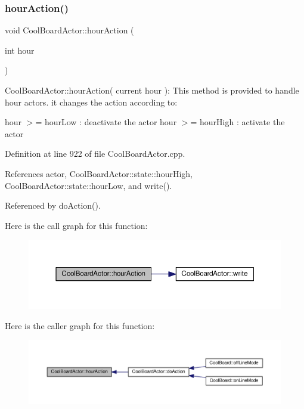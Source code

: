 \subsubsection{\texorpdfstring{hour\+Action()}{hourAction()}}
{\footnotesize\ttfamily void Cool\+Board\+Actor\+::hour\+Action (\begin{DoxyParamCaption}\item[{int}]{hour }\end{DoxyParamCaption})}

Cool\+Board\+Actor\+::hour\+Action( current hour )\+: This method is provided to handle hour actors. it changes the action according to\+:

hour $>$= hour\+Low \+: deactivate the actor hour $>$= hour\+High \+: activate the actor 

Definition at line 922 of file Cool\+Board\+Actor.\+cpp.



References actor, Cool\+Board\+Actor\+::state\+::hour\+High, Cool\+Board\+Actor\+::state\+::hour\+Low, and write().



Referenced by do\+Action().

Here is the call graph for this function\+:
\nopagebreak
\begin{figure}[H]
\begin{center}
\leavevmode
\includegraphics[width=350pt]{dc/d69/class_cool_board_actor_adf3b4e15b9d73681082112adf8ef95cb_cgraph}
\end{center}
\end{figure}
Here is the caller graph for this function\+:
\nopagebreak
\begin{figure}[H]
\begin{center}
\leavevmode
\includegraphics[width=350pt]{dc/d69/class_cool_board_actor_adf3b4e15b9d73681082112adf8ef95cb_icgraph}
\end{center}
\end{figure}
\mbox{\label{class_cool_board_actor_a6d93a24502c56ced2ef7675c913a276b}} 
